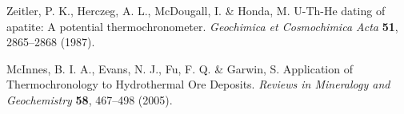 \documentclass[gchron, manuscript]{copernicus}
\begin{document}
\begin{thebibliography}{}
Zeitler, P. K., Herczeg, A. L., McDougall, I. \& Honda, M. U-Th-He dating of apatite: A potential thermochronometer. \emph{Geochimica et Cosmochimica Acta} \textbf{51}, 2865--2868 (1987).

McInnes, B. I. A., Evans, N. J., Fu, F. Q. \& Garwin, S. Application of Thermochronology to Hydrothermal Ore Deposits. \emph{Reviews in Mineralogy and Geochemistry} \textbf{58}, 467--498 (2005).

\end{thebibliography}
\end{document}
